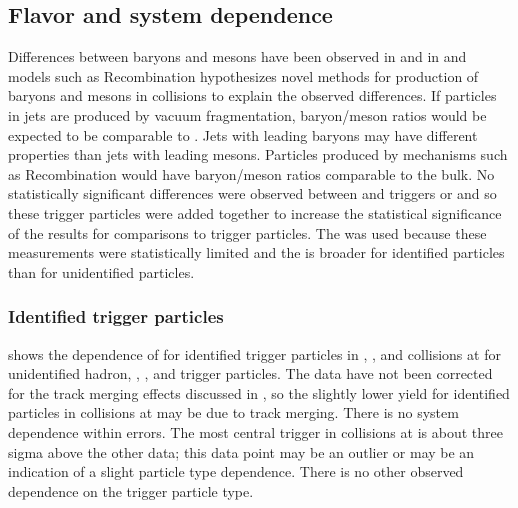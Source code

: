 \subsection{Flavor and system dependence}
Differences between baryons and mesons have been observed in \RAA and in \vtwo and models such as Recombination hypothesizes novel methods for production of baryons and mesons in \AplusA collisions to explain the observed differences.  If particles in jets are produced by vacuum fragmentation, baryon/meson ratios would be expected to be comparable to \pp.  Jets with leading baryons may have different properties than jets with leading mesons.  Particles produced by mechanisms such as Recombination would have baryon/meson ratios comparable to the bulk.  No statistically significant differences were observed between \lam and \alam triggers or \xibary and \axibary so these trigger particles were added together to increase the statistical significance of the results for comparisons to \kaon trigger particles.  The \dphi was used because these measurements were statistically limited and the \jlc is broader for identified particles than for unidentified particles.

\subsubsection{Identified trigger particles}

 shows the \pttrig dependence of \njet for identified trigger particles in \dAu, \Cu, and \Au collisions at \sNNtwohundred for unidentified hadron, \lam, \kaon, and \myxi trigger particles.    The \Au data have not been corrected for the track merging effects discussed in , so the slightly lower yield for identified particles in \Au collisions at \sNNtwohundred may be due to track merging.  There is no system dependence within errors.  The most central \kaon trigger in \Cu collisions at \sNNtwohundred is about three sigma above the other data; this data point may be an outlier or may be an indication of a slight particle type dependence.  There is no other observed dependence on the trigger particle type.

